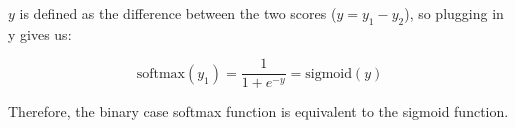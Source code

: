 \documentclass[11pt]{article}
\begin{document}
\begin{enumerate}
{$y$ is defined as the difference between the two scores ($y = y_1 - y_2$), so plugging in y gives us:

\[
\text{softmax}(y_1) = \frac{1}{1 + e^{-y}} = \text{sigmoid}(y)
\]

Therefore, the binary case softmax function is equivalent to the sigmoid function. 
}





\end{enumerate}
\end{document}
